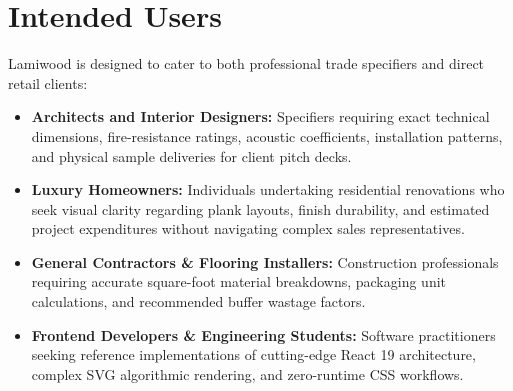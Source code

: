 \documentclass[12pt,a4paper]{report}
\begin{document}
\section{Intended Users}
Lamiwood is designed to cater to both professional trade specifiers and direct retail clients:
\begin{itemize}
    \item \textbf{Architects and Interior Designers:} Specifiers requiring exact technical dimensions, fire-resistance ratings, acoustic coefficients, installation patterns, and physical sample deliveries for client pitch decks.
    \item \textbf{Luxury Homeowners:} Individuals undertaking residential renovations who seek visual clarity regarding plank layouts, finish durability, and estimated project expenditures without navigating complex sales representatives.
    \item \textbf{General Contractors \& Flooring Installers:} Construction professionals requiring accurate square-foot material breakdowns, packaging unit calculations, and recommended buffer wastage factors.
    \item \textbf{Frontend Developers \& Engineering Students:} Software practitioners seeking reference implementations of cutting-edge React 19 architecture, complex SVG algorithmic rendering, and zero-runtime CSS workflows.
\end{itemize}
\end{document}
